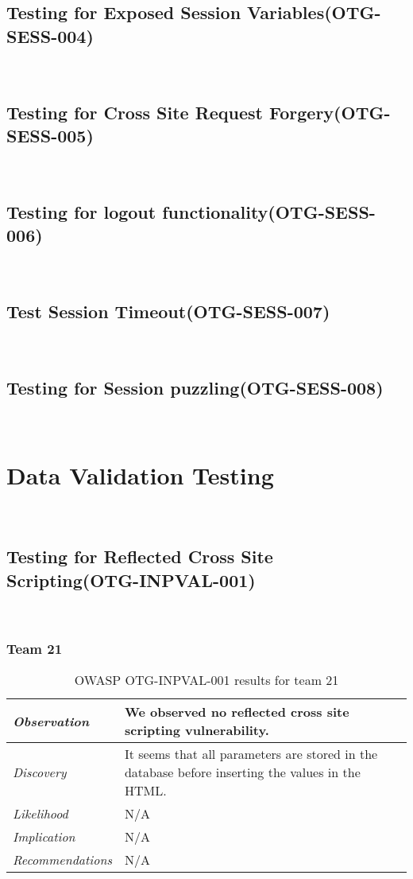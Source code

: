 \documentclass[headsepline,footsepline,footinclude=false,oneside,fontsize=11pt,paper=a4,listof=totoc,bibliography=totoc]{scrbook} %
\begin{document}
\subsection{Testing for Exposed Session Variables(OTG-SESS-004)}\
\pagebreak
\subsection{Testing for Cross Site Request Forgery(OTG-SESS-005)}\
\pagebreak
\subsection{Testing for logout functionality(OTG-SESS-006)}\
\pagebreak
\subsection{Test Session Timeout(OTG-SESS-007)}\
\pagebreak
\subsection{Testing for Session puzzling(OTG-SESS-008)}\

\pagebreak
\section{Data Validation Testing}\
\subsection{Testing for Reflected Cross Site Scripting(OTG-INPVAL-001)}\

\subsubsection{Team 21}

\begin{table}[H]
	\centering
	\begin{tabular}{l p{11cm}}
		\textit{Observation} & We observed no reflected cross site scripting vulnerability. \\
		\hline
		\textit{Discovery} &  It seems that all parameters are stored in the database before inserting the values in the HTML. \\
		\hline
		\textit{Likelihood} & N/A\\
		\hline
		\textit{Implication} & N/A\\
		\hline
		\textit{Recommendations} & N/A\\
	\end{tabular}
	\caption{OWASP OTG-INPVAL-001 results for team 21}
	\label{table:scenario2}
\end{table}
\end{document}
